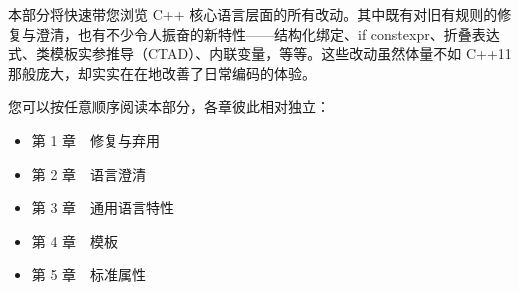 本部分将快速带您浏览 C++ 核心语言层面的所有改动。其中既有对旧有规则的修复与澄清，也有不少令人振奋的新特性——结构化绑定、if constexpr、折叠表达式、类模板实参推导（CTAD）、内联变量，等等。这些改动虽然体量不如 C++11 那般庞大，却实实在在地改善了日常编码的体验。

您可以按任意顺序阅读本部分，各章彼此相对独立：

\begin{itemize}
  \item 第 1 章　修复与弃用
  \item 第 2 章　语言澄清
  \item 第 3 章　通用语言特性
  \item 第 4 章　模板
  \item 第 5 章　标准属性
\end{itemize}
